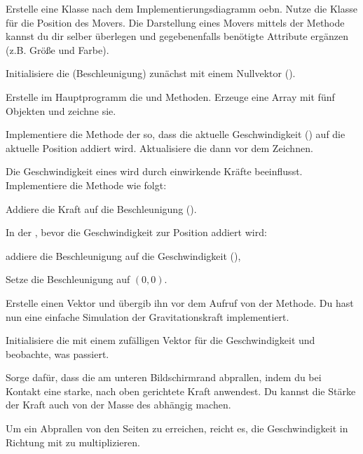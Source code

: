 \documentclass[10pt, a4paper, ngerman]{arbeitsblatt}
\begin{document}
\begin{aufgabe}
\begin{enumerate}
	\item
	Erstelle eine Klasse  nach dem Implementierungsdiagramm oebn. Nutze die  Klasse für die Position des Movers. Die Darstellung eines Movers mittels der  Methode kannst du dir selber überlegen und gegebenenfalls benötigte Attribute ergänzen (z.B. Größe und Farbe).

	Initialisiere die  (Beschleunigung) zunächst mit einem Nullvektor ().
	\item
	Erstelle im Hauptprogramm die  und  Methoden. Erzeuge eine Array mit fünf  Objekten und zeichne sie.
	\item
	{Implementiere die  Methode der  so, dass die aktuelle Geschwindigkeit () auf die aktuelle Position addiert wird. Aktualisiere die  dann vor dem Zeichnen.

	}
	\item
	Die Geschwindigkeit eines  wird durch einwirkende Kräfte beeinflusst. Implementiere die Methode  wie folgt:
	\end{smallitem}
	\item
	Erstelle einen Vektor  und übergib ihn vor dem Aufruf von  der  Methode. Du hast nun eine einfache Simulation der Gravitationskraft implementiert.
	\item
	Initialisiere die  mit einem zufälligen Vektor für die Geschwindigkeit und beobachte, was passiert.
	\item
	Sorge dafür, dass die  am unteren Bildschirmrand abprallen, indem du bei Kontakt eine starke, nach oben gerichtete Kraft anwendest. Du kannst die Stärke der Kraft auch von der Masse des  abhängig machen.

	Um ein Abprallen von den Seiten zu erreichen, reicht es, die Geschwindigkeit in  Richtung mit  zu multiplizieren.
\end{enumerate}
\end{aufgabe}
\end{document}
